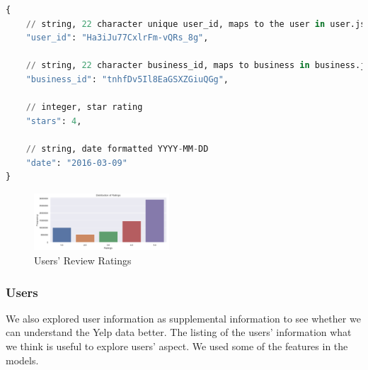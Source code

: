 \documentclass[journal]{IEEEtran}
\begin{document}
\begin{lstlisting}[language=Python, caption=Review Data Example]
{
    // string, 22 character unique user_id, maps to the user in user.json
    "user_id": "Ha3iJu77CxlrFm-vQRs_8g",
    
    // string, 22 character business_id, maps to business in business.json
    "business_id": "tnhfDv5Il8EaGSXZGiuQGg",
    
    // integer, star rating
    "stars": 4,
    
    // string, date formatted YYYY-MM-DD
    "date": "2016-03-09"
}
\end{lstlisting}

\begin{figure}
\begin {center}
\includegraphics[width=0.45\textwidth]{images/review_rating_bar_chart.png}
\caption{Users' Review Ratings}
\label{fig:review_rating}
\end {center}
\end{figure}


\subsubsection{Users}
We also explored user information as supplemental information to see whether we can understand the Yelp data better. The listing of the users' information what we think is useful to explore users' aspect. We used some of the features in the models.
\end{document}
